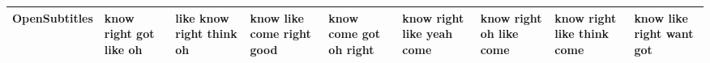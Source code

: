 \documentclass[11pt,a4paper]{article}
\begin{document}
\begin{appendices}
\begin{table}[htb]
\begin{tiny}
\begin{tabular}{|p{}|p{}|p{}|p{}|p{}|p{}|p{}|p{}|p{}|}
    OpenSubtitles & know \newline right \newline got \newline like \newline oh & like \newline know \newline right \newline think \newline oh & know \newline like \newline come \newline right \newline good & know \newline come \newline got \newline oh \newline right & know \newline right \newline like \newline yeah \newline come & know \newline right \newline oh \newline like \newline come & know \newline right \newline like \newline think \newline come & know \newline like \newline right \newline want \newline got\\\hline

\end{tabular}
\end{tiny}
\end{table}
\end{appendices}
\end{document}
